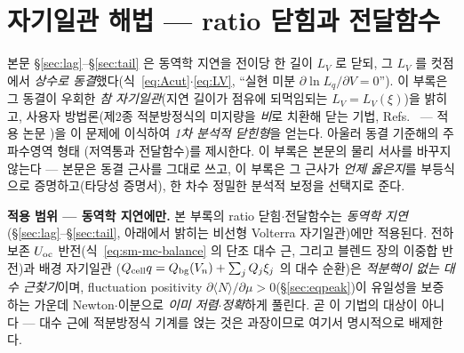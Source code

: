 \setcounter{section}{4}
\section{자기일관 해법 --- ratio 닫힘과 전달함수}\label{sec:appendix-selfconsistent}
본문 \S\ref{sec:lag}--\S\ref{sec:tail} 은 동역학 지연을 전이당 한 길이 $L_V$ 로 닫되, 그 $L_V$ 를 컷점에서
\emph{상수로 동결}했다(식~\eqref{eq:Acut}$\cdot$\eqref{eq:LV}, ``실현 미분 $\partial\ln L_q/\partial V=0$''). 이 부록은
그 동결이 우회한 \emph{참 자기일관}(지연 길이가 점유에 되먹임되는 $L_V=L_V(\xi)$)을 밝히고, 사용자 방법론(제2종
적분방정식의 미지량을 \emph{비}로 치환해 닫는 기법, Refs.~\cite{lee2011jcp,son2013jcp} --- 적용 논문
\cite{lee2017jcp})을 이 문제에 이식하여 \emph{1차 분석적 닫힌형}을 얻는다. 아울러 동결 기준해의 주파수영역 형태
(저역통과 전달함수)를 제시한다. 이 부록은 본문의 물리 서사를 바꾸지 않는다 --- 본문은 동결 근사를 그대로 쓰고,
이 부록은 그 근사가 \emph{언제 옳은지}를 부등식으로 증명하고(타당성 증명서), 한 차수 정밀한 분석적 보정을 선택지로 준다.

\begin{warnbox}
\textbf{적용 범위 --- 동역학 지연에만.} 본 부록의 ratio 닫힘$\cdot$전달함수는 \emph{동역학 지연}
(\S\ref{sec:lag}--\S\ref{sec:tail}, 아래에서 밝히는 비선형 Volterra 자기일관)에만 적용된다. 전하 보존
$U_{\mathrm{oc}}$ 반전(식~\eqref{eq:sm-mc-balance} 의 단조 대수 근, 그리고 블렌드 장의 이중합 반전)과 배경 자기일관
($Q_{\mathrm{cell}} q=Q_{\mathrm{bg}}(V_n)+\sum_jQ_j\xi_j$ 의 대수 순환)은 \emph{적분핵이 없는 대수 근찾기}이며, fluctuation positivity
$\partial\langle N\rangle/\partial\mu>0$(\S\ref{sec:eqpeak})이 유일성을 보증하는 가운데 Newton$\cdot$이분으로
\emph{이미 저렴$\cdot$정확}하게 풀린다. 곧 이 기법의 대상이 아니다 --- 대수 근에 적분방정식 기계를 얹는 것은
과장이므로 여기서 명시적으로 배제한다.
\end{warnbox}

